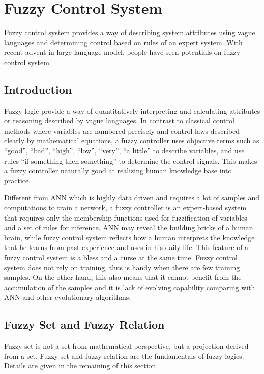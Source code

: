\chapter{Fuzzy Control System} \label{ch:fcs}

Fuzzy control system provides a way of describing system attributes using vague languages and determining control based on rules of an expert system. With recent advent in large language model, people have seen potentials on fuzzy control system.

\section{Introduction}

Fuzzy logic provide a way of quantitatively interpreting and calculating attributes or reasoning described by vague languages. In contrast to classical control methods where variables are numbered precisely and control laws described clearly by mathematical equations, a fuzzy controller uses objective terms such as ``good'', ``bad'', ``high'', ``low'', ``very'', ``a little'' to describe variables, and use rules ``if something then something'' to determine the control signals. This makes a fuzzy controller naturally good at realizing human knowledge base into practice.

Different from ANN which is highly data driven and requires a lot of samples and computations to train a network, a fuzzy controller is an expert-based system that requires only the membership functions used for fuzzification of variables and a set of rules for inference. ANN may reveal the building bricks of a human brain, while fuzzy control system reflects how a human interprets the knowledge that he learns from past experience and uses in his daily life. This feature of a fuzzy control system is a bless and a curse at the same time. Fuzzy control system does not rely on training, thus is handy when there are few training samples. On the other hand, this also means that it cannot benefit from the accumulation of the samples and it is lack of evolving capability comparing with ANN and other evolutionary algorithms.

\section{Fuzzy Set and Fuzzy Relation}

Fuzzy set is not a set from mathematical perspective, but a projection derived from a set. Fuzzy set and fuzzy relation are the fundamentals of fuzzy logics. Details are given in the remaining of this section.

